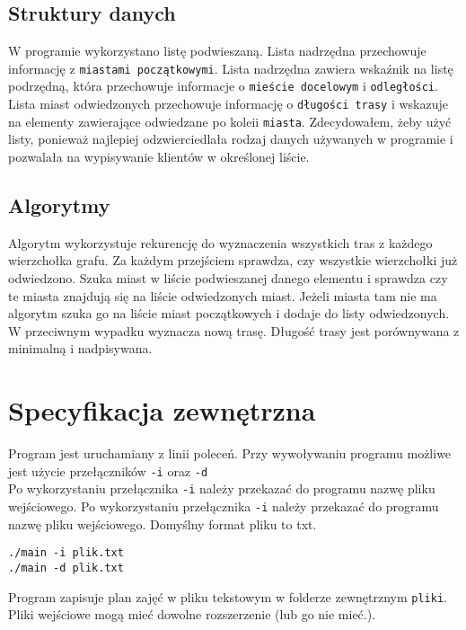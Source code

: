 \documentclass[12pt,a4paper,twoside]{article}
\let\oldmarginpar\marginpar
\renewcommand\marginpar[1]{%
  {\linespread{0.85}\normalfont\scriptsize%
\oldmarginpar[\hspace{1cm}\begin{minipage}{3cm}\raggedleft\scriptsize\color{black}\textsf{#1}\end{minipage}]%
{\hspace{0cm}\begin{minipage}{3cm}\raggedright\scriptsize\color{black}\textsf{#1}\end{minipage}}%
}%
}
\begin{document}
\subsection{Struktury danych}
\marginpar{}
W programie wykorzystano listę podwieszaną. Lista nadrzędna przechowuje informację z \texttt{miastami początkowymi}. Lista nadrzędna zawiera wskaźnik na listę podrzędną, która przechowuje informacje o \texttt{mieście docelowym}  i \texttt{odległości}. Lista miast odwiedzonych przechowuje informację o \texttt{długości trasy} i wskazuje  na elementy zawierające odwiedzane po koleii \texttt{miasta}. Zdecydowałem, żeby użyć listy, ponieważ najlepiej odzwierciedlała rodzaj danych używanych w programie i pozwalała na wypisywanie klientów w określonej liście.





\subsection{Algorytmy}
\marginpar{}
Algorytm wykorzystuje rekurencję do wyznaczenia wszystkich tras z każdego wierzchołka grafu. Za każdym przejściem sprawdza, czy wszystkie wierzchołki już odwiedzono. Szuka miast w liście podwieszanej danego elementu i sprawdza czy te miasta znajdują się na liście odwiedzonych miast. Jeżeli miasta tam nie ma algorytm szuka go na liście miast początkowych i dodaje do listy odwiedzonych. W przeciwnym wypadku wyznacza nową trasę. Długość trasy jest porównywana z minimalną i nadpisywana.


\section{Specyfikacja zewnętrzna}
\marginpar{}

Program jest uruchamiany z linii poleceń. 
Przy wywoływaniu programu możliwe jest użycie przełączników   \texttt{-i} oraz \texttt{-d}\\ 
Po wykorzystaniu przełącznika  \texttt{-i} należy przekazać do programu nazwę pliku wejściowego. Po wykorzystaniu przełącznika  \texttt{-i} należy przekazać do programu nazwę pliku wejściowego. Domyślny format pliku to txt.
\begin{verbatim}
./main -i plik.txt
./main -d plik.txt
\end{verbatim}

Program zapisuje plan zajęć w pliku tekstowym w folderze zewnętrznym \texttt{pliki}. 
Pliki wejściowe mogą mieć dowolne rozszerzenie (lub go nie mieć.).
\end{document}
